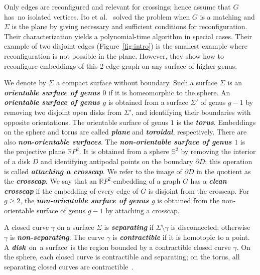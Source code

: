 \documentclass[a4paper,USenglish,cleveref,colorlinks=true,urlcolor=black,linkcolor=black,citecolor=black,thm-restate,authorcolumns]{lipics-v2021}
\theoremstyle{claimstyle}
\def\defn#1{\textit{\textbf{\boldmath #1}}}
\renewcommand{\emph}[1]{\defn{#1}}
\begin{document}
Only edges are reconfigured and relevant for crossings; hence assume that $G$ has~no isolated vertices.
%
Ito et al.~\cite{ItoIK0MNOO25} solved the
problem when $G$ is a matching and $\Sigma$ is the plane by giving necessary and sufficient conditions for reconfiguration.
Their characterization yields a polynomial-time algorithm
in special cases.
Their example of two disjoint edges (Figure~\ref{fig:intro}) is the smallest example where reconfiguration is not possible in the plane.
However, they show how to reconfigure embeddings of this 2-edge graph on any surface of higher genus.


We denote by $\Sigma$ a compact surface without boundary.
Such a surface $\Sigma$ is an \emph{orientable surface of genus $0$} if it is homeomorphic to the sphere.
An \emph{orientable surface of genus $g$} is obtained from a surface $\Sigma'$ of genus $g-1$ by removing two disjoint open disks from  $\Sigma'$,
and identifying their boundaries with opposite orientations.
The {orientable surface of genus $1$} is the \emph{torus}.
Embeddings on the sphere and torus are called
\emph{plane} and \emph{toroidal}, respectively.
There are also \emph{non-orientable surfaces}.
The \emph{non-orientable surface of genus $1$} is the projective plane $\mathbb{R}P^2$.
It is obtained from a sphere $\mathbb{S}^2$ by removing the interior of a disk $D$ and identifying antipodal points on the boundary $\partial D$; this operation is called \emph{attaching a crosscap}.
We refer to the image of $\partial D$ in the quotient as the \emph{crosscap}.
We say that an $\mathbb{R}P^2$-embedding of a graph $G$ has a \emph{clean crosscap} if the embedding of every edge of $G$ is disjoint from the crosscap.
For $g \ge 2$, the \emph{non-orientable surface of genus $g$} is obtained from the non-orientable surface of genus $g-1$ by attaching a crosscap.

A closed curve $\gamma$ on a surface $\Sigma$ is \emph{separating} if $\Sigma \setminus \gamma$ is disconnected;
otherwise~$\gamma$ is \emph{non-separating}.
The curve $\gamma$ is \emph{contractible} if it is homotopic to a point.
A \emph{disk}~on~a surface~is the region bounded by a contractible closed curve $\gamma$.
On the sphere, each closed curve is contractible and separating;
on the torus, all separating closed curves are contractible~\cite{viro2024elementary}.
\end{document}
